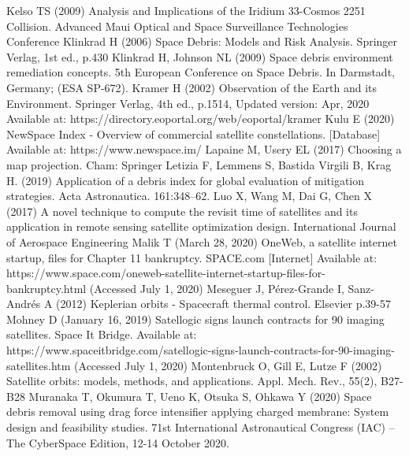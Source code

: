 \documentclass[12pt,a4paper,notitlepage,oneside,openright]{report}
\begin{document}
\begin{thebibliography}{100}
 Kelso TS (2009) Analysis and Implications of the Iridium 33-Cosmos 2251 Collision. Advanced Maui Optical and Space Surveillance Technologies Conference
 Klinkrad H (2006) Space Debris: Models and Risk Analysis. Springer Verlag, 1st ed., p.430
 Klinkrad H, Johnson NL (2009) Space debris environment remediation concepts. 5th European Conference on Space Debris. In Darmstadt, Germany; (ESA SP-672). 
 Kramer H (2002) Observation of the Earth and its Environment. Springer Verlag, 4th ed., p.1514, Updated version: Apr, 2020 Available at: https://directory.eoportal.org/web/eoportal/kramer
 Kulu E (2020) NewSpace Index - Overview of commercial satellite constellations. [Database] Available at: https://www.newspace.im/
 Lapaine M, Usery EL (2017) Choosing a map projection. Cham: Springer
 Letizia F, Lemmens S, Bastida Virgili B, Krag H. (2019) Application of a debris index for global evaluation of mitigation strategies. Acta Astronautica. 161:348–62.
 Luo X, Wang M, Dai G, Chen X (2017) A novel technique to compute the revisit time of satellites and its application in remote sensing satellite optimization design. International Journal of Aerospace Engineering
 Malik T (March 28, 2020) OneWeb, a satellite internet startup, files for Chapter 11 bankruptcy. SPACE.com [Internet] Available at: https://www.space.com/oneweb-satellite-internet-startup-files-for-bankruptcy.html (Accessed July 1, 2020)
 Meseguer J, Pérez-Grande I, Sanz-Andrés A (2012) Keplerian orbits - Spacecraft thermal control. Elsevier p.39-57
 Mohney D (January 16, 2019) Satellogic signs launch contracts for 90 imaging satellites. Space It Bridge. Available at: https://www.spaceitbridge.com/satellogic-signs-launch-contracts-for-90-imaging-satellites.htm (Accessed July 1, 2020)
 Montenbruck O, Gill E, Lutze F (2002) Satellite orbits: models, methods, and applications. Appl. Mech. Rev., 55(2), B27-B28
 Muranaka T, Okumura T, Ueno K, Otsuka S, Ohkawa Y (2020) Space debris removal using drag force intensifier applying charged membrane: System design and feasibility studies. 71st International Astronautical Congress (IAC) – The CyberSpace Edition, 12-14 October 2020. 

\end{thebibliography}
\end{document}

